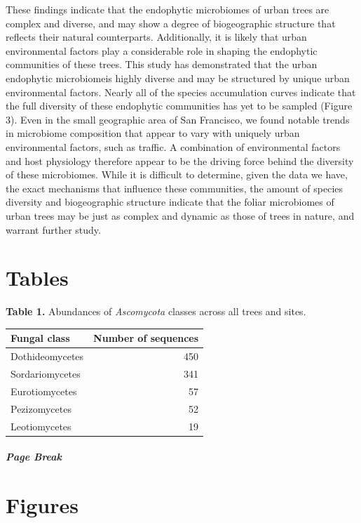 \documentclass[fleqn,10pt,lineno]{wlpeerj} %
\begin{document}
These findings indicate that the endophytic microbiomes of urban trees
are complex and diverse, and may show a degree of biogeographic
structure that reflects their natural counterparts. Additionally, it is
likely that urban environmental factors play a considerable role in
shaping the endophytic communities of these trees. This study has
demonstrated that the urban endophytic microbiomeis highly diverse and
may be structured by unique urban environmental factors. Nearly all of
the species accumulation curves indicate that the full diversity of
these endophytic communities has yet to be sampled (Figure 3). Even in
the small geographic area of San Francisco, we found notable trends in
microbiome composition that appear to vary with uniquely urban
environmental factors, such as traffic. A combination of environmental
factors and host physiology therefore appear to be the driving force
behind the diversity of these microbiomes. While it is difficult to
determine, given the data we have, the exact mechanisms that influence
these communities, the amount of species diversity and biogeographic
structure indicate that the foliar microbiomes of urban trees may be
just as complex and dynamic as those of trees in nature, and warrant
further study.

\hypertarget{tables}{%
\section{Tables}\label{tables}}

\textbf{Table 1.} Abundances of \emph{Ascomycota} classes across all
trees and sites.

\begin{longtable}[]{@{}lr@{}}
\toprule
Fungal class & Number of sequences \\
\midrule
\endhead
Dothideomycetes & 450 \\
Sordariomycetes & 341 \\
Eurotiomycetes & 57 \\
Pezizomycetes & 52 \\
Leotiomycetes & 19 \\
\bottomrule
\end{longtable}

\hypertarget{page-break}{%
\subparagraph{Page Break}\label{page-break}}

\hypertarget{figures}{%
\section{Figures}\label{figures}}
\end{document}
